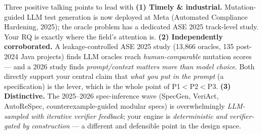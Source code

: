 \documentclass[11pt]{article}
\begin{document}
\begin{okboxx}{Three positive talking points to lead with}
\textbf{(1) Timely \& industrial.} Mutation-guided LLM test generation is now
deployed at Meta (Automated Compliance Hardening, 2025); the oracle problem has
a dedicated ASE 2025 track-level study. Your RQ is exactly where the field's
attention is. \textbf{(2) Independently corroborated.} A leakage-controlled
ASE 2025 study (13{,}866 oracles, 135 post-2024 Java projects) finds LLM
oracles reach \emph{human-comparable} mutation scores --- and a 2026 study
finds \emph{prompt/context matters more than model choice}. Both directly
support your central claim that \emph{what you put in the prompt} (a
specification) is the lever, which is the whole point of P1$<$P2$<$P3.
\textbf{(3) Distinctive.} The 2025--2026 spec-inference wave (SpecGen, VeriAct,
AutoReSpec, counterexample-guided modular specs) is overwhelmingly
\emph{LLM-sampled with iterative verifier feedback}; your engine is
\emph{deterministic and verifier-gated by construction} --- a different and
defensible point in the design space.
\end{okboxx}
\end{document}
